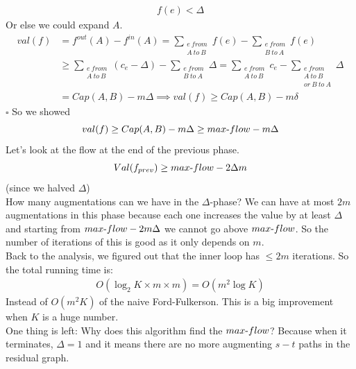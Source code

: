 \documentclass[12 pt]{article}
\begin{document}
        \begin{align*}
          f(e) < \Delta
        \end{align*}
        Or else we could expand $A$.
        \begin{align*}
          val(f) & = f^{out}(A)-f^{in}(A) = \sum_{\substack{e \ from \\ A \ to \ B}} f(e)- \sum_{\substack{e \ from \\ B \ to \ A}}f(e)
          \\ & \geq \sum_{\substack{e \ from \\A \ to \ B}} (c_e - \Delta) - \sum_{\substack{e \ from \\ B \ to \ A}}\Delta = \sum_{\substack{e \ from \\ A \ to \ B}}c_e - \sum_{\substack{e \ from \\ A \ to \ B \\ or \ B \ to \ A}} \Delta
          \\ & = Cap(A,B) -m\Delta \implies val(f) \geq Cap(A,B)-m\delta 
        \end{align*}
        \hfill $\square$
        So we showed $$val(f) \geq Cap(A,B)-m\Delta \geq max\hbox{-}flow -
        m\Delta$$
        Let's look at the flow at the end of the previous phase.
        $$Val(f_{prev})\geq max\hbox{-}flow - 2\Delta m$$ (since we halved
        $\Delta$)
        \\ How many augmentations can we have in the $\Delta$-phase?
        We can have at most $2m$ augmentations in this phase because each one
        increases the value by at least $\Delta$ and starting from
        $max\hbox{-}flow-2m\Delta$ we cannot go above $max\hbox{-}flow$. So the
        number of iterations of this is good as it only depends on
        $m$.
        \\ Back to the analysis, we figured out that the inner loop
        has $\leq 2m$ iterations. So the total running time is:
        \begin{align*}
          O(\log_2 K \times m \times m) = O(m^2 \log K)
        \end{align*}
        Instead of $O(m^2K)$ of the naive Ford-Fulkerson. This is a
        big improvement when $K$ is a huge number.
        \\ One thing is left: Why does this algorithm find the
        $max\hbox{-}flow$? Because when it terminates, $\Delta=1$ and it
        means there are no more augmenting $s-t$ paths in the residual
        graph.
\end{document}
